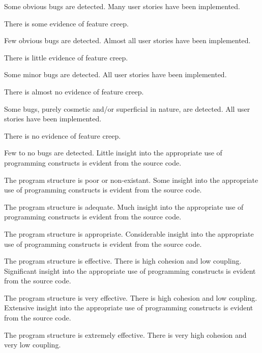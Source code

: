 \documentclass{../../fal_assignment}
\begin{document}
\begin{markingrubric}
            \par Some obvious bugs are detected.
        \grade Many user stories have been implemented.
            \par There is some evidence of feature creep.
            \par Few obvious bugs  are detected.
        \grade Almost all user stories have been implemented.
            \par There is little evidence of feature creep.
            \par Some minor bugs  are detected.
        \grade All user stories have been implemented.
            \par There is almost no evidence of feature creep.
            \par Some bugs, purely cosmetic and/or superficial in nature, are detected.
        \grade All user stories have been implemented.
            \par There is no evidence of feature creep.
            \par Few to no bugs are detected.
%
        \grade \fail Little insight into the appropriate use of programming constructs is evident from the source code.
            \par The program structure is poor or non-existant.
        \grade Some insight into the appropriate use of programming constructs is evident from the source code.
            \par The program structure is adequate.
        \grade Much insight into the appropriate use of programming constructs is evident from the source code.
            \par The program structure is appropriate.
        \grade Considerable insight into the appropriate use of programming constructs is evident from the source code.
            \par The program structure is effective. There is high cohesion and low coupling.
        \grade Significant insight into the appropriate use of programming constructs is evident from the source code.
            \par The program structure is very effective. There is high cohesion and low coupling.
        \grade Extensive insight into the appropriate use of programming constructs is evident from the source code.
            \par The program structure is extremely effective. There is very high cohesion and very low coupling.
%

\end{markingrubric}
\end{document}
